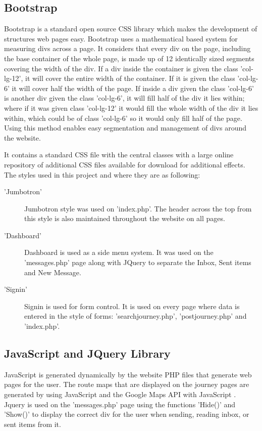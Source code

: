 	\subsection{Bootstrap}
		Bootstrap\cite{bootstrap_css} is a standard open source CSS library which makes the development of structures web pages easy. Bootstrap uses a mathematical based system for measuring divs across a page. It considers that every div on the page, including the base container of the whole page, is made up of 12 identically sized segments covering the width of the div. If a div inside the container is given the class 'col-lg-12', it will cover the entire width of the container. If it is given the class 'col-lg-6' it will cover half the width of the page. If inside a div given the class 'col-lg-6' is another div given the class 'col-lg-6', it will fill half of the div it lies within; where if it was given class 'col-lg-12' it would fill the whole width of the div it lies within, which could be of class 'col-lg-6' so it would only fill half of the page. Using this method enables easy segmentation and management of divs around the website.
		
		It contains a standard CSS file with the central classes with a large online repository of additional CSS files available for download for additional effects. The styles used in this project and where they are as following:
		\begin{description}
		\item['Jumbotron'] Jumbotron\cite{bootstrap_jumbotron} style was used on 'index.php'. The header across the top from this style is also maintained throughout the website on all pages.
		\item['Dashboard'] Dashboard\cite{bootstrap_dashboard} is used as a side menu system. It was used on the 'messages.php' page along with JQuery to separate the Inbox, Sent items and New Message.
		\item['Signin'] Signin\cite{bootstrap_signin} is used for form control. It is used on every page where data is entered in the style of forms: 'search\textunderscore journey.php', 'post\textunderscore journey.php' and 'index.php'.
		\end{description}
	\subsection{JavaScript and JQuery Library}
		JavaScript is generated dynamically by the website PHP files that generate web pages for the user. The route maps that are displayed on the journey pages are generated by using JavaScript and the Google Maps API with JavaScript \cite{google_maps_javascript_api}. Jquery is used on the 'messages.php' page using the functions 'Hide()' and 'Show()' to display the correct div for the user when sending, reading inbox, or sent items from it.

